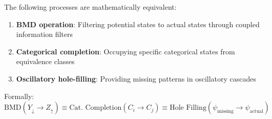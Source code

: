 \begin{theorem}
\label{thm:triple_equivalence}
The following processes are mathematically equivalent:
\begin{enumerate}
\item \textbf{BMD operation}: Filtering potential states to actual states through coupled information filters
\item \textbf{Categorical completion}: Occupying specific categorical states from equivalence classes
\item \textbf{Oscillatory hole-filling}: Providing missing patterns in oscillatory cascades
\end{enumerate}

Formally:
\begin{equation}
\text{BMD}(Y_{\downarrow} \to Z_{\uparrow}) \equiv \text{Cat. Completion}(C_i \to C_j) \equiv \text{Hole Filling}(\psi_{\text{missing}} \to \psi_{\text{actual}})
\end{equation}
\end{theorem}


